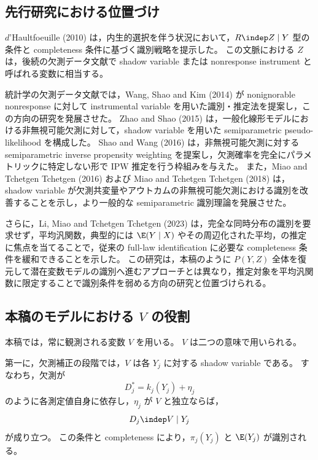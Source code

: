 \subsection{先行研究における位置づけ}

$d$'Haultfoeuille (2010) は，内生的選択を伴う状況において，$R\indep Z\mid Y$ 型の条件と completeness 条件に基づく識別戦略を提示した。
この文脈における $Z$ は，後続の欠測データ文献で shadow variable または nonresponse instrument と呼ばれる変数に相当する。

統計学の欠測データ文献では，Wang, Shao and Kim (2014) が nonignorable nonresponse に対して instrumental variable を用いた識別・推定法を提案し，この方向の研究を発展させた。
Zhao and Shao (2015) は，一般化線形モデルにおける非無視可能欠測に対して，shadow variable を用いた semiparametric pseudo-likelihood を構成した。
Shao and Wang (2016) は，非無視可能欠測に対する semiparametric inverse propensity weighting を提案し，欠測確率を完全にパラメトリックに特定しない形で IPW 推定を行う枠組みを与えた。
また，Miao and Tchetgen Tchetgen (2016) および Miao and Tchetgen Tchetgen (2018) は，shadow variable が欠測共変量やアウトカムの非無視可能欠測における識別を改善することを示し，より一般的な semiparametric 識別理論を発展させた。

さらに，Li, Miao and Tchetgen Tchetgen (2023) は，完全な同時分布の識別を要求せず，平均汎関数，典型的には $\E(Y\mid X)$ やその周辺化された平均，の推定に焦点を当てることで，従来の full-law identification に必要な completeness 条件を緩和できることを示した。
この研究は，本稿のように $P(Y,Z)$ 全体を復元して潜在変数モデルの識別へ進むアプローチとは異なり，推定対象を平均汎関数に限定することで識別条件を弱める方向の研究と位置づけられる。

\subsection{本稿のモデルにおける $V$ の役割}

本稿では，常に観測される変数 $V$ を用いる。
$V$ は二つの意味で用いられる。

第一に，欠測補正の段階では，$V$ は各 $Y_j$ に対する shadow variable である。
すなわち，欠測が
\begin{equation}
  D_j^*=k_j(Y_j)+\eta_j
  \label{eq:shadow-yj-missing}
\end{equation}
のように各測定値自身に依存し，$\eta_j$ が $V$ と独立ならば，
\begin{equation}
  D_j\indep V\mid Y_j
  \label{eq:v-shadow-yj}
\end{equation}
が成り立つ。
この条件と completeness により，$\pi_j(Y_j)$ と $\E(Y_j)$ が識別される。

